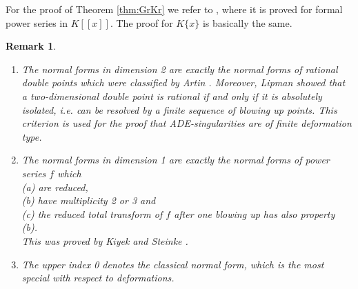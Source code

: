 \documentclass[11pt]{article}
\newtheorem{Remark}[Definition]{Remark}
\begin{document}


For the proof of Theorem \ref{thm:GrKr} we refer to \cite{GrKr90}, where it is proved for formal power series in $K[[x]]$. The proof for $K\{x\}$ is basically the same.

\begin{Remark} {\em
\begin{enumerate}
\item The normal forms in dimension 2 are exactly the normal forms of rational double points which were classified by Artin \cite{Ar77}. Moreover, Lipman \cite{Lip1} showed that a two-dimensional double point is rational if and only if it is absolutely isolated, i.e. can be resolved by a finite sequence of blowing up points. This criterion is used for the proof that ADE-singularities are of finite deformation type.

\item The normal forms in dimension 1 are exactly the normal forms of power series $f$ which \\
\text{   } (a) are reduced, \\
\text{   } (b) have multiplicity 2 or 3 and \\
\text{   } (c) the reduced total transform of $f$ after one blowing up has also property (b). \\
This was proved by Kiyek and Steinke \cite{KS85}.
\item The upper index 0 denotes the classical normal form, which is the most special with respect to deformations.
\end {enumerate}
}
\end{Remark}
\end{document}
